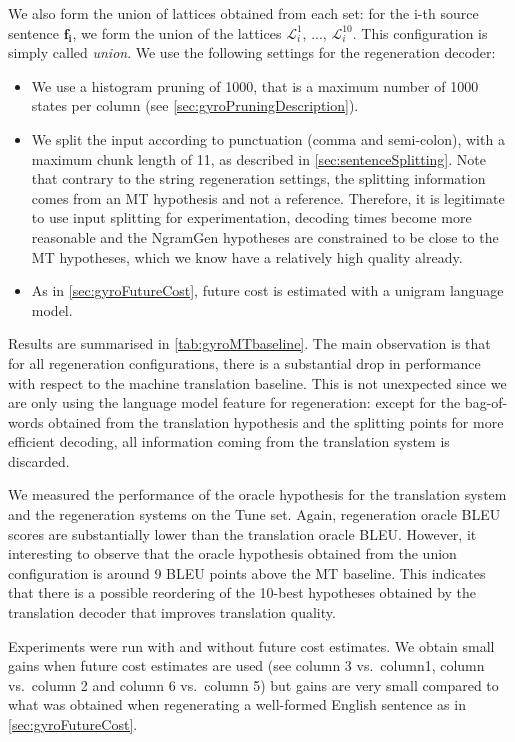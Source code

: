 We also form the union of lattices
obtained from each set:
for the i-th source sentence $\bm{f_i}$, we form the union
of the lattices $\mathcal{L}_i^1$, ..., $\mathcal{L}_i^{10}$.
This configuration is simply
called \emph{union}.
We use the following settings for the regeneration decoder:
%
\begin{itemize}
  \item We use a histogram pruning of 1000, that is a maximum number of 1000 states
    per column (see \autoref{sec:gyroPruningDescription}).
  \item We split the input according to punctuation (comma and semi-colon), with
    a maximum chunk length of 11, as described in \autoref{sec:sentenceSplitting}.
    Note that contrary to the string regeneration settings, the splitting information
    comes from an MT hypothesis and not a reference. Therefore, it is legitimate
    to use input splitting for experimentation, decoding times become more
    reasonable and the NgramGen hypotheses are constrained to be close to
    the MT hypotheses, which we know have a relatively high quality already.
  \item As in \autoref{sec:gyroFutureCost}, future cost is estimated with a unigram language model.
\end{itemize}
%
Results are summarised in \autoref{tab:gyroMTbaseline}.
The main observation is that for all regeneration configurations, there
is a substantial drop in performance with respect
to the machine translation baseline. This is not unexpected
since we are only using the language model feature for regeneration:
except for the bag-of-words obtained from the translation hypothesis and
the splitting points for more efficient decoding, all information coming from the translation system
is discarded.

We measured the performance of the oracle hypothesis %
for the translation system and the regeneration systems on the Tune set.
Again, regeneration oracle BLEU scores are substantially
lower than the translation oracle BLEU.
However, it interesting to observe that
the oracle hypothesis obtained from the union configuration is
around 9 BLEU points above the MT baseline. This indicates that
there is a possible reordering of the 10-best hypotheses obtained by
the translation decoder that improves translation quality.

Experiments were run with and without future cost estimates.
We obtain small gains when future cost estimates are used (see column 3 vs.\ column1,
column vs.\ column 2 and column 6 vs.\ column 5)
but gains are very small compared to what was obtained
when regenerating a well-formed English sentence as in \autoref{sec:gyroFutureCost}.

